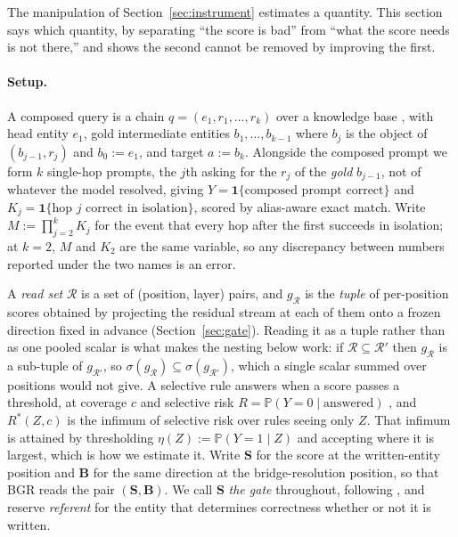 \documentclass{article}
\newcommand{\gate}{\mathbf{S}}
\newcommand{\bridge}{\mathbf{B}}
\begin{document}
The manipulation of Section~\ref{sec:instrument} estimates a quantity. This section says which
quantity, by separating ``the score is bad'' from ``what the score needs is not there,'' and shows
the second cannot be removed by improving the first.

\paragraph{Setup.} A composed query is a chain $q=(e_1,r_1,\dots,r_k)$ over a knowledge base
\citep{vrandecic2014wikidata}, with head entity $e_1$, gold intermediate entities $b_1,\dots,b_{k-1}$
where $b_j$ is the object of $(b_{j-1},r_j)$ and $b_0:=e_1$, and target $a:=b_k$. Alongside the
composed prompt we form $k$ single-hop prompts, the $j$th asking for the $r_j$ of the \emph{gold}
$b_{j-1}$, not of whatever the model resolved, giving
$Y=\mathbf{1}\{\text{composed prompt correct}\}$ and $K_j=\mathbf{1}\{\text{hop }j\text{ correct in
isolation}\}$, scored by alias-aware exact match. Write $M:=\prod_{j=2}^{k}K_j$ for the event that
every hop after the first succeeds in isolation; at $k=2$, $M$ and $K_2$ are the same variable, so any
discrepancy between numbers reported under the two names is an error.

A \emph{read set} $\mathcal{R}$ is a set of (position, layer) pairs, and $g_{\mathcal{R}}$ is the
\emph{tuple} of per-position scores obtained by projecting the residual stream at each of them onto a
frozen direction fixed in advance (Section~\ref{sec:gate}). Reading it as a tuple rather than as one
pooled scalar is what makes the nesting below work: if $\mathcal{R}\subseteq\mathcal{R}'$ then
$g_{\mathcal{R}}$ is a sub-tuple of $g_{\mathcal{R}'}$, so $\sigma(g_{\mathcal{R}})\subseteq
\sigma(g_{\mathcal{R}'})$, which a single scalar summed over positions would not give. A selective
rule answers when a score passes a threshold, at coverage $c$ and selective risk
$R=\mathbb{P}(Y=0\mid\text{answered})$ \citep{chow1970optimum,elyaniv2010foundations}, and
$R^\ast(Z,c)$ is the infimum of selective risk over rules seeing only $Z$. That infimum is attained by
thresholding $\eta(Z):=\mathbb{P}(Y=1\mid Z)$ and accepting where it is largest, which is how we
estimate it. Write $\gate$ for the score at the written-entity position and $\bridge$ for the same
direction at the bridge-resolution position, so that BGR reads the pair $(\gate,\bridge)$. We call
$\gate$ \emph{the gate} throughout, following \citet{ferrando2025entity}, and reserve
\emph{referent} for the entity that determines correctness whether or not it is written.
\end{document}
